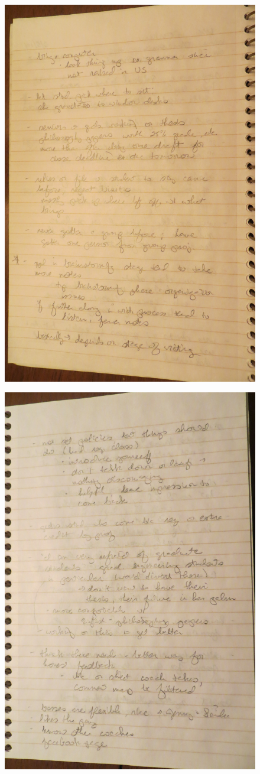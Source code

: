 \documentclass[12pt]{article} %
\begin{document}
  \begin{figure}[H]
  \centering
  \includegraphics[width=0.75\linewidth]{RAZ_raw_notes9}
  \caption{}
  \label{fig:rn9}
  \end{figure}
  \begin{figure}[H]
  \centering
  \includegraphics[width=0.75\linewidth]{RAZ_raw_notes10}
  \caption{}
  \label{fig:rn10}
  \end{figure}
\end{document}
